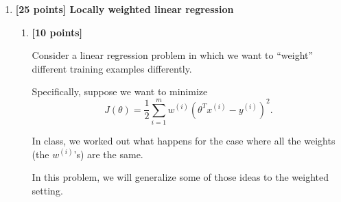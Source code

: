 \documentclass[10pt]{article}
\begin{document}
\begin{enumerate}
\begin{enumerate}[label=(\alph*)]
Since each summand is positive semidefinite,
their sum is also positive semidefinite:
\[
\boxed{
\nabla_\theta^2J(\theta)\succeq 0.
}
\]

Therefore, the negative log-likelihood loss of a
canonical GLM is convex on its convex parameter domain.
\hfill $\square$


\end{enumerate}

\medskip

\textit{Remark:}
The main takeaways from this problem are:
\begin{itemize}[leftmargin=1.5em]
    \item Any GLM model is convex in its model parameters.
    \item The exponential family of probability distributions are
    mathematically nice. Whereas calculating mean and variance of
    distributions in general involves integrals, we can calculate them
    using derivatives for exponential family distributions.
\end{itemize}


\newpage

\item \textbf{[25 points] Locally weighted linear regression}

\begin{enumerate}[label=(\alph*)]


\item \textbf{[10 points]}

Consider a linear regression problem in which we want to ``weight''
different training examples differently.

Specifically, suppose we want to minimize
\[
J(\theta)
=
\frac12
\sum_{i=1}^{m}
w^{(i)}
\left(
\theta^Tx^{(i)}-y^{(i)}
\right)^2.
\]

In class, we worked out what happens for the case where all the
weights (the $w^{(i)}$'s) are the same.

In this problem, we will generalize some of those ideas to the
weighted setting.

\begin{enumerate}[label=\roman*.]



\end{enumerate}
\end{enumerate}
\end{enumerate}
\end{document}
